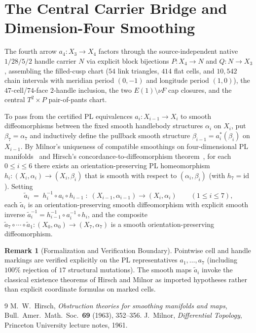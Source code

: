 \documentclass[10pt,reqno]{amsart}
\theoremstyle{definition}
\newtheorem{remark}[theorem]{Remark}
\begin{document}
\section{The Central Carrier Bridge and Dimension-Four Smoothing}

The fourth arrow $a_4:X_3\to X_4$ factors through the source-independent native $1/28/5/2$ handle carrier $N$ via explicit block bijections $P:X_4\to N$ and $Q:N\to X_3$, assembling the filled-cusp chart ($54$ link triangles, $414$ flat cells, and $10{,}542$ chain intervals with meridian period $(0,-1)$ and longitude period $(1,0)$), the $47$-cell/$74$-face $2$-handle inclusion, the two $E(1)\setminus\nu F$ cap closures, and the central $T^2\times P$ pair-of-pants chart.

To pass from the certified PL equivalences $a_i:X_{i-1}\to X_i$ to smooth diffeomorphisms between the fixed smooth handlebody structures $\alpha_i$ on $X_i$, put $\beta_7=\alpha_7$ and inductively define the pullback smooth structure $\beta_{i-1}=a_i^*(\beta_i)$ on $X_{i-1}$. By Milnor's uniqueness of compatible smoothings on four-dimensional PL manifolds~\cite{Milnor1961} and Hirsch's concordance-to-diffeomorphism theorem~\cite{Hirsch1963}, for each $0\le i\le 6$ there exists an orientation-preserving PL homeomorphism $h_i:(X_i,\alpha_i)\to(X_i,\beta_i)$ that is smooth with respect to $(\alpha_i,\beta_i)$ (with $h_7=\mathrm{id}$). Setting
\[
  \tilde{a}_i \;=\; h_i^{-1}\circ a_i\circ h_{i-1} \;:\; (X_{i-1},\alpha_{i-1}) \longrightarrow (X_i,\alpha_i) \qquad (1\le i\le 7),
\]
each $\tilde{a}_i$ is an orientation-preserving smooth diffeomorphism with explicit smooth inverse $\tilde{a}_i^{-1} = h_{i-1}^{-1}\circ a_i^{-1}\circ h_i$, and the composite $\tilde{a}_7\circ\cdots\circ\tilde{a}_1 : (X_0,\alpha_0)\to (X_7,\alpha_7)$ is a smooth orientation-preserving diffeomorphism.

\begin{remark}[Formalization and Verification Boundary]
Pointwise cell and handle markings are verified explicitly on the PL representatives $a_1,\dots,a_7$ (including $100\%$ rejection of $17$ structural mutations). The smooth maps $\tilde{a}_i$ invoke the classical existence theorems of Hirsch and Milnor as imported hypotheses rather than explicit coordinate formulas on marked cells.
\end{remark}

\begin{thebibliography}{9}
M.~W.~Hirsch, \emph{Obstruction theories for smoothing manifolds and maps}, Bull.\ Amer.\ Math.\ Soc.\ \textbf{69} (1963), 352--356.
J.~Milnor, \emph{Differential Topology}, Princeton University lecture notes, 1961.
\end{thebibliography}
\end{document}
